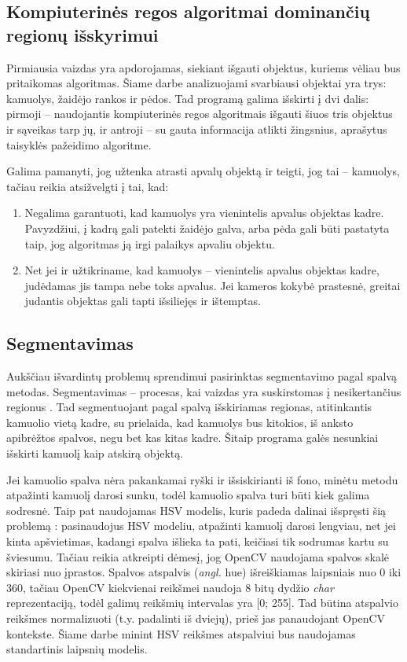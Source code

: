 \documentclass{VUMIFPSkursinis}
\begin{document}
\subsection{Kompiuterinės regos algoritmai dominančių regionų išskyrimui}
Pirmiausia vaizdas yra apdorojamas, siekiant išgauti objektus, kuriems vėliau bus pritaikomas algoritmas. Šiame darbe analizuojami svarbiausi objektai yra trys: kamuolys, žaidėjo rankos ir pėdos. Tad programą galima išskirti į dvi dalis: pirmoji – naudojantis kompiuterinės regos algoritmais išgauti šiuos tris objektus ir sąveikas tarp jų, ir antroji – su gauta informacija atlikti žingsnius, aprašytus taisyklės pažeidimo algoritme. 

Galima pamanyti, jog užtenka atrasti apvalų objektą ir teigti, jog tai – kamuolys, tačiau reikia atsižvelgti į tai, kad: 
\begin{enumerate}
\item Negalima garantuoti, kad kamuolys yra vienintelis apvalus objektas kadre. Pavyzdžiui, į kadrą gali patekti žaidėjo galva, arba pėda gali būti pastatyta taip, jog algoritmas ją irgi palaikys apvaliu objektu. 
\item Net jei ir užtikriname, kad kamuolys – vienintelis apvalus objektas kadre, judėdamas jis tampa nebe toks apvalus. Jei kameros kokybė prastesnė, greitai judantis objektas gali tapti išsiliejęs ir ištemptas.
\end{enumerate}
\subsection{Segmentavimas}
Aukščiau išvardintų problemų sprendimui pasirinktas segmentavimo pagal spalvą metodas. Segmentavimas – procesas, kai vaizdas yra suskirstomas į nesikertančius regionus \cite{ImageSegmTech}. Tad segmentuojant pagal spalvą išskiriamas regionas, atitinkantis kamuolio vietą kadre, su prielaida, kad kamuolys bus kitokios, iš anksto apibrėžtos spalvos, negu bet kas kitas kadre. Šitaip programa galės nesunkiai išskirti kamuolį kaip atskirą objektą. 

Jei kamuolio spalva nėra pakankamai ryški ir išsiskirianti iš fono, minėtu metodu atpažinti kamuolį darosi sunku, todėl kamuolio spalva turi būti kiek galima sodresnė. Taip pat naudojamas HSV modelis, kuris padeda dalinai išspręsti šią problemą \cite{StaloTenisas}: pasinaudojus HSV modeliu, atpažinti kamuolį darosi lengviau, net jei kinta apšvietimas, kadangi spalva išlieka ta pati, keičiasi tik sodrumas kartu su šviesumu. Tačiau reikia atkreipti dėmesį, jog OpenCV naudojama spalvos skalė skiriasi nuo įprastos. Spalvos atspalvis (\textit{angl.} hue) išreiškiamas laipsniais nuo 0 iki 360, tačiau OpenCV kiekvienai reikšmei naudoja 8 bitų dydžio \textit{char} reprezentaciją, todėl galimų reikšmių intervalas yra [0; 255]. Tad būtina atspalvio reikšmes normalizuoti (t.y. padalinti iš dviejų), prieš jas panaudojant OpenCV kontekste. Šiame darbe minint HSV reikšmes atspalviui bus naudojamas standartinis laipsnių modelis.
\end{document}
